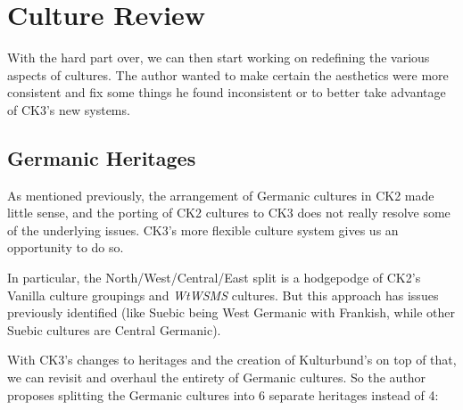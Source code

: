 \documentclass{article}
\begin{document}
	\newpage
	
	\section{Culture Review}
	\label{sec:culture_review}
	
	With the hard part over, we can then start working on redefining the various aspects of cultures.
	The author wanted to make certain the aesthetics were more consistent and fix some things he found inconsistent or to better take advantage of CK3's new systems.
	
	\subsection{Germanic Heritages}
	\label{sec:culture_review:subsec:germanic_heritages}
	As mentioned previously, the arrangement of Germanic cultures in CK2 made little sense, and the porting of CK2 cultures to CK3 does not really resolve some of the underlying issues.
	CK3's more flexible culture system gives us an opportunity to do so.
	
	In particular, the North/West/Central/East split is a hodgepodge of CK2's Vanilla culture groupings and \textit{WtWSMS} cultures.
	But this approach has issues previously identified (like Suebic being West Germanic with Frankish, while other Suebic cultures are Central Germanic).
	
	With CK3's changes to heritages and the creation of Kulturbund's on top of that, we can revisit and overhaul the entirety of Germanic cultures.
	So the author proposes splitting the Germanic cultures into 6 separate heritages instead of 4:
	
\end{document}
